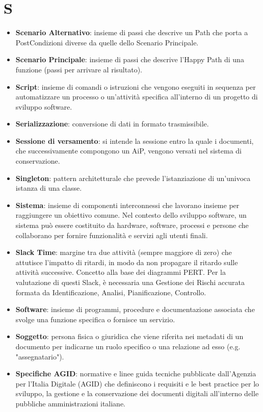 \documentclass[a4paper,12pt]{article}
\begin{document}
\section{S}
\begin{itemize}
    \item \textbf{Scenario Alternativo}: insieme di passi che descrive un Path che porta a PostCondizioni diverse da quelle dello Scenario Principale.
    \item \textbf{Scenario Principale}: insieme di passi che descrive l'Happy Path di una funzione (passi per arrivare al risultato).
    \item \textbf{Script}: insieme di comandi o istruzioni che vengono eseguiti in sequenza per automatizzare un processo o un'attività specifica all'interno di un progetto di sviluppo software.
    \item \textbf{Serializzazione}: conversione di dati in formato trasmissibile.
    \item \textbf{Sessione di versamento}: si intende la sessione entro la quale i documenti, che successivamente compongono un AiP, vengono versati nel sistema di conservazione.
    \item \textbf{Singleton}: pattern architetturale che prevede l'istanziazione di un'univoca istanza di una classe. 
    \item \textbf{Sistema}: insieme di componenti interconnessi che lavorano insieme per raggiungere un obiettivo comune. Nel contesto dello sviluppo software, un sistema può essere costituito da hardware, software, processi e persone che collaborano per fornire funzionalità e servizi agli utenti finali.
    \item \textbf{Slack Time}: margine tra due attività (sempre maggiore di zero) che attutisce l'impatto di ritardi, in modo da non propagare il ritardo sulle attività successive. Concetto alla base dei diagrammi PERT. Per la valutazione di questi Slack, è necessaria una Gestione dei Rischi accurata formata da Identificazione, Analisi, Pianificazione, Controllo.
    \item \textbf{Software}: insieme di programmi, procedure e documentazione associata che svolge una funzione specifica o fornisce un servizio.
    \item \textbf{Soggetto}: persona fisica o giuridica che viene riferita nei metadati di un documento per indicarne un ruolo specifico o una relazione ad esso (e.g. "assegnatario").
    \item \textbf{Specifiche AGID}: normative e linee guida tecniche pubblicate dall'Agenzia per l'Italia Digitale (AGID) che definiscono i requisiti e le best practice per lo sviluppo, la gestione e la conservazione dei documenti digitali all'interno delle pubbliche amministrazioni italiane.

\end{itemize}
\end{document}
